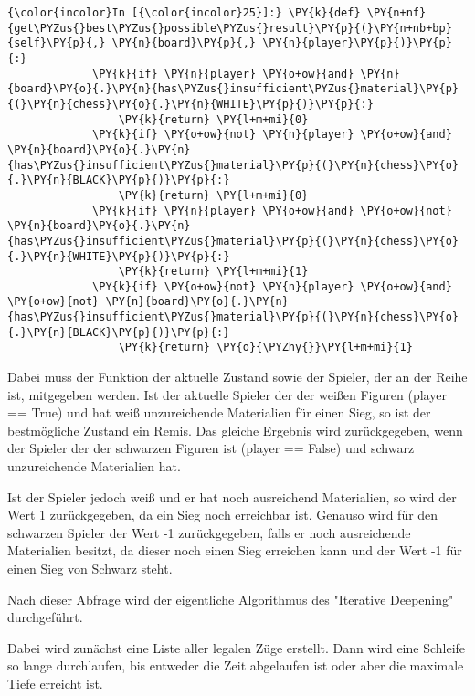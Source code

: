     \begin{Verbatim}[commandchars=\\\{\}]
{\color{incolor}In [{\color{incolor}25}]:} \PY{k}{def} \PY{n+nf}{get\PYZus{}best\PYZus{}possible\PYZus{}result}\PY{p}{(}\PY{n+nb+bp}{self}\PY{p}{,} \PY{n}{board}\PY{p}{,} \PY{n}{player}\PY{p}{)}\PY{p}{:}
             \PY{k}{if} \PY{n}{player} \PY{o+ow}{and} \PY{n}{board}\PY{o}{.}\PY{n}{has\PYZus{}insufficient\PYZus{}material}\PY{p}{(}\PY{n}{chess}\PY{o}{.}\PY{n}{WHITE}\PY{p}{)}\PY{p}{:}
                 \PY{k}{return} \PY{l+m+mi}{0}
             \PY{k}{if} \PY{o+ow}{not} \PY{n}{player} \PY{o+ow}{and} \PY{n}{board}\PY{o}{.}\PY{n}{has\PYZus{}insufficient\PYZus{}material}\PY{p}{(}\PY{n}{chess}\PY{o}{.}\PY{n}{BLACK}\PY{p}{)}\PY{p}{:}
                 \PY{k}{return} \PY{l+m+mi}{0}
             \PY{k}{if} \PY{n}{player} \PY{o+ow}{and} \PY{o+ow}{not} \PY{n}{board}\PY{o}{.}\PY{n}{has\PYZus{}insufficient\PYZus{}material}\PY{p}{(}\PY{n}{chess}\PY{o}{.}\PY{n}{WHITE}\PY{p}{)}\PY{p}{:}
                 \PY{k}{return} \PY{l+m+mi}{1}
             \PY{k}{if} \PY{o+ow}{not} \PY{n}{player} \PY{o+ow}{and} \PY{o+ow}{not} \PY{n}{board}\PY{o}{.}\PY{n}{has\PYZus{}insufficient\PYZus{}material}\PY{p}{(}\PY{n}{chess}\PY{o}{.}\PY{n}{BLACK}\PY{p}{)}\PY{p}{:}
                 \PY{k}{return} \PY{o}{\PYZhy{}}\PY{l+m+mi}{1}
\end{Verbatim}

    Dabei muss der Funktion der aktuelle Zustand sowie der Spieler, der an
der Reihe ist, mitgegeben werden. Ist der aktuelle Spieler der der
weißen Figuren (player == True) und hat weiß unzureichende Materialien
für einen Sieg, so ist der bestmögliche Zustand ein Remis. Das gleiche
Ergebnis wird zurückgegeben, wenn der Spieler der der schwarzen Figuren
ist (player == False) und schwarz unzureichende Materialien hat.

Ist der Spieler jedoch weiß und er hat noch ausreichend Materialien, so
wird der Wert 1 zurückgegeben, da ein Sieg noch erreichbar ist. Genauso
wird für den schwarzen Spieler der Wert -1 zurückgegeben, falls er noch
ausreichende Materialien besitzt, da dieser noch einen Sieg erreichen
kann und der Wert -1 für einen Sieg von Schwarz steht.

Nach dieser Abfrage wird der eigentliche Algorithmus des "Iterative
Deepening" durchgeführt.

    Dabei wird zunächst eine Liste aller legalen Züge erstellt. Dann wird
eine Schleife so lange durchlaufen, bis entweder die Zeit abgelaufen ist
oder aber die maximale Tiefe erreicht ist.


